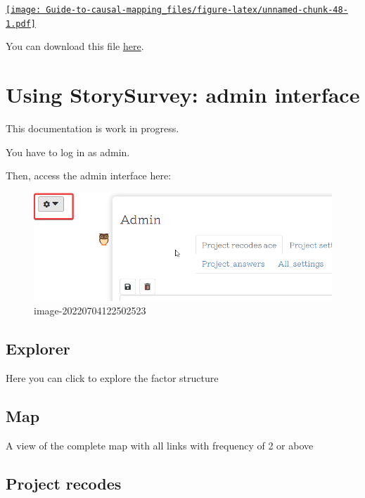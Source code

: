 \documentclass[
]{book}
\begin{document}
\href{https://player.vimeo.com/video/599620015}{\texttt{[image: Guide-to-causal-mapping\_files/figure-latex/unnamed-chunk-48-1.pdf]}}

You can download this file \href{https://docs.google.com/spreadsheets/d/12eXQDJtvlLO6qRrwbxwvkchfdTNLSbjo/edit?usp=sharing\&ouid=112812082380437768869\&rtpof=true\&sd=true}{here}.

\hypertarget{using-storysurvey-admin-interface}{%
\chapter{Using StorySurvey: admin interface}\label{using-storysurvey-admin-interface}}

This documentation is work in progress.

You have to log in as admin.

Then, access the admin interface here:

\begin{figure}
\centering
\includegraphics{_assets/image-20220704122502523.png}
\caption{image-20220704122502523}
\end{figure}

\hypertarget{explorer}{%
\section{Explorer}\label{explorer}}

Here you can click to explore the factor structure

\hypertarget{map}{%
\section{Map}\label{map}}

A view of the complete map with all links with frequency of 2 or above

\hypertarget{project-recodes}{%
\section{Project recodes}\label{project-recodes}}
\end{document}
